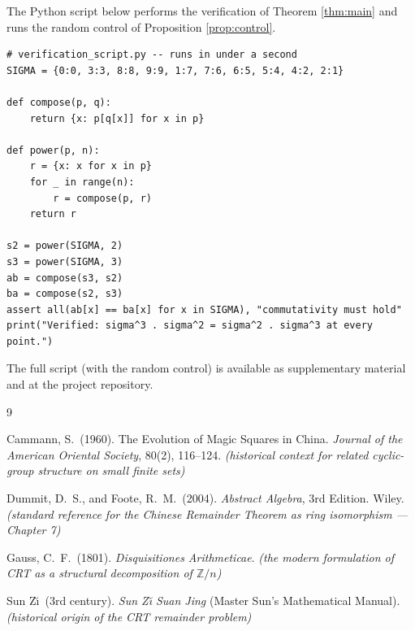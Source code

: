 \documentclass[11pt]{article}
\theoremstyle{plain}
\theoremstyle{definition}
\theoremstyle{remark}
\begin{document}
The Python script below performs the verification of Theorem \ref{thm:main} and runs the random control of Proposition \ref{prop:control}.

\begin{verbatim}
# verification_script.py -- runs in under a second
SIGMA = {0:0, 3:3, 8:8, 9:9, 1:7, 7:6, 6:5, 5:4, 4:2, 2:1}

def compose(p, q):
    return {x: p[q[x]] for x in p}

def power(p, n):
    r = {x: x for x in p}
    for _ in range(n):
        r = compose(p, r)
    return r

s2 = power(SIGMA, 2)
s3 = power(SIGMA, 3)
ab = compose(s3, s2)
ba = compose(s2, s3)
assert all(ab[x] == ba[x] for x in SIGMA), "commutativity must hold"
print("Verified: sigma^3 . sigma^2 = sigma^2 . sigma^3 at every point.")
\end{verbatim}

The full script (with the random control) is available as supplementary material and at the project repository.

\begin{thebibliography}{9}

Cammann, S.\ (1960).
The Evolution of Magic Squares in China.
\emph{Journal of the American Oriental Society}, 80(2), 116--124.
\textit{(historical context for related cyclic-group structure on small finite sets)}

Dummit, D.~S., and Foote, R.~M.\ (2004).
\emph{Abstract Algebra}, 3rd Edition.
Wiley.
\textit{(standard reference for the Chinese Remainder Theorem as ring isomorphism --- Chapter 7)}

Gauss, C.~F.\ (1801).
\emph{Disquisitiones Arithmeticae}.
\textit{(the modern formulation of CRT as a structural decomposition of $\mathbb{Z}/n$)}

Sun Z\u{\i}\ (3rd century).
\emph{Sun Z\u{\i} Suan Jing} (Master Sun's Mathematical Manual).
\textit{(historical origin of the CRT remainder problem)}

\end{thebibliography}
\end{document}
